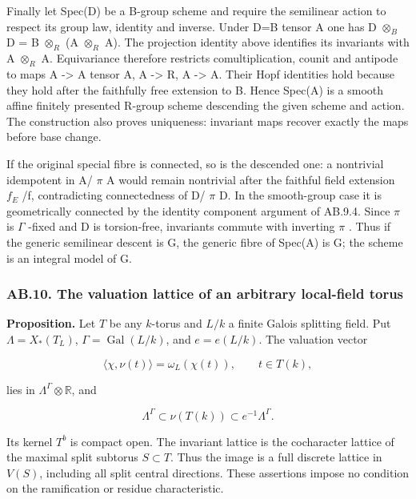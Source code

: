 \documentclass[
  11pt,
]{article}
\begin{document}
Finally let Spec(D) be a B-group scheme and require the semilinear
action to respect its group law, identity and inverse. Under D=B tensor
A one has D \(\otimes_{B}\) D = B \(\otimes_{R}\) (A \(\otimes_{R}\) A).
The projection identity above identifies its invariants with A
\(\otimes_{R}\) A. Equivariance therefore restricts comultiplication,
counit and antipode to maps A -\textgreater{} A tensor A, A
-\textgreater{} R, A -\textgreater{} A. Their Hopf identities hold
because they hold after the faithfully free extension to B. Hence
Spec(A) is a smooth affine finitely presented R-group scheme descending
the given scheme and action. The construction also proves uniqueness:
invariant maps recover exactly the maps before base change.

If the original special fibre is connected, so is the descended one: a
nontrivial idempotent in A/ \(\pi\) A would remain nontrivial after the
faithful field extension \(f_{E}\) /f, contradicting connectedness of D/
\(\pi\) D. In the smooth-group case it is geometrically connected by the
identity component argument of AB.9.4. Since \(\pi\) is \(\Gamma\)
-fixed and D is torsion-free, invariants commute with inverting \(\pi\)
. Thus if the generic semilinear descent is G, the generic fibre of
Spec(A) is G; the scheme is an integral model of G.

\subsubsection{AB.10. The valuation lattice of an arbitrary local-field
torus}\label{ab.10.-the-valuation-lattice-of-an-arbitrary-local-field-torus}

\textbf{Proposition.} Let \(T\) be any \(k\)-torus and \(L/k\) a finite
Galois splitting field. Put \(\Lambda=X_*(T_L)\),
\(\Gamma=\operatorname{Gal}(L/k)\), and \(e=e(L/k)\). The valuation
vector

\[
 \langle\chi,\nu(t)\rangle=\omega_L(\chi(t)),\qquad t\in T(k),
 \tag{AB.21}
\]

lies in \(\Lambda^\Gamma\otimes\mathbb R\), and

\[
 \Lambda^\Gamma\subset\nu(T(k))\subset e^{-1}\Lambda^\Gamma.
 \tag{AB.22}
\]

Its kernel \(T^b\) is compact open. The invariant lattice is the
cocharacter lattice of the maximal split subtorus \(S\subset T\). Thus
the image is a full discrete lattice in \(V(S)\), including all split
central directions. These assertions impose no condition on the
ramification or residue characteristic.
\end{document}
